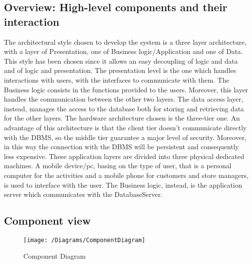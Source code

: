 \subsection{Overview: High-level components and their interaction}

The architectural style chosen to develop the system is a three layer architecture, with a layer of Presentation, one of Business logic/Application and one of Data. This style has been chosen since it allows an easy decoupling of logic and data and of logic and presentation. The presentation level is the one which handles interactions with users, with the interfaces to communicate with them.
The Business logic consists in the functions provided to the users. Moreover, this layer handles the communication between the other two layers. The data access layer, instead, manages the access to the database both for storing and retrieving data for the other layers. The hardware architecture chosen is the three-tier one. An advantage of this architecture is that the client tier doesn't communicate directly with the DBMS, so the middle tier guarantee a major level of security. Moreover, in this way the connection with the DBMS will be persistent and consequently less expensive. These application layers are divided into three physical dedicated machines. A mobile device/pc, basing on the type of user, that is a personal computer for the activities and a mobile phone for customers and store managers, is used to interface with the user. The Business logic, instead, is the application server which communicates with the DatabaseServer.

\subsection{Component view}
\begin{figure}[H]
	\centering
	\texttt{[image: /Diagrams/ComponentDiagram]}
	\caption{Component Diagram}
\end{figure}



